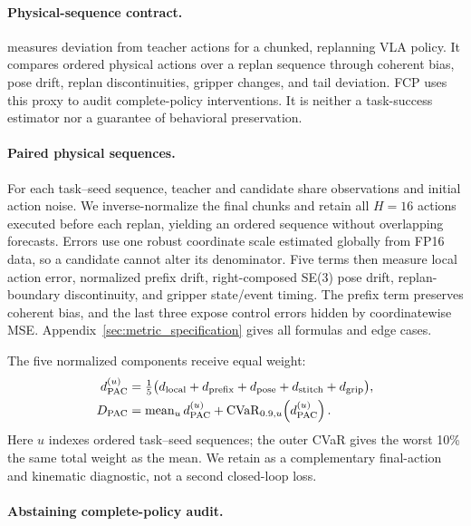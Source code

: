 \paragraph{Physical-sequence contract.}
\dpac measures deviation from teacher actions for a chunked, replanning VLA policy. It compares ordered physical actions over a replan sequence through coherent bias, pose drift, replan discontinuities, gripper changes, and tail deviation. FCP uses this proxy to audit complete-policy interventions. It is neither a task-success estimator nor a guarantee of behavioral preservation.

\paragraph{Paired physical sequences.}
For each task--seed sequence, teacher and candidate share observations and initial action noise. We inverse-normalize the final chunks and retain all $H=16$ actions executed before each replan, yielding an ordered sequence without overlapping forecasts. Errors use one robust coordinate scale estimated globally from FP16 data, so a candidate cannot alter its denominator. Five terms then measure local action error, normalized prefix drift, right-composed SE(3) pose drift, replan-boundary discontinuity, and gripper state/event timing. The prefix term preserves coherent bias, and the last three expose control errors hidden by coordinatewise MSE. Appendix~\ref{sec:metric_specification} gives all formulas and edge cases.

The five normalized components receive equal weight:
\begin{equation}
 \begin{aligned}
 d_{\mathrm{PAC}}^{(u)}&=\tfrac{1}{5}\bigl(
 d_{\mathrm{local}}+d_{\mathrm{prefix}}+d_{\mathrm{pose}}+
 d_{\mathrm{stitch}}+d_{\mathrm{grip}}\bigr),\\
 D_{\mathrm{PAC}}&=\operatorname{mean}_u d_{\mathrm{PAC}}^{(u)}+
 \operatorname{CVaR}_{0.9,u}\!\left(d_{\mathrm{PAC}}^{(u)}\right).
 \end{aligned}
 \label{eq:dpac_sequence}
\end{equation}
Here $u$ indexes ordered task--seed sequences; the outer CVaR gives the worst 10\% the same total weight as the mean. We retain \dfunc as a complementary final-action and kinematic diagnostic, not a second closed-loop loss.

\paragraph{Abstaining complete-policy audit.}
\label{sec:fcp}

